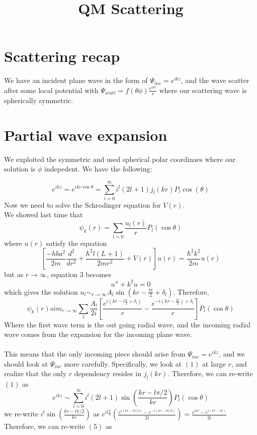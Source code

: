 \documentclass{article}
\title{QM Scattering}
\begin{document}
\maketitle
\section*{Scattering recap}
We have an incident plane wave in the form of $ \Psi_{inc}= e^{ik z}$, and the wave scatter after some local potential with $ \Psi_{scatt} = f( \theta  \phi) \frac{e^{ikr}}{r}$ where our scattering wave is spherically symmetric.

\section*{Partial wave expansion}
We exploited the symmetric and used spherical polar coordinaes where our solution is $ \phi$ indepedent. We have the following:

\begin{equation}
e^{ikz} = e^{ikr  \cos  \theta} = \sum_{i=0}^{ \infty} i^l (2l+1) j_l (kr) P_l  \cos  (\theta)
\end{equation}
Now we need to solve the Schrodinger equation for $V(r)$. \\ 
We showed last time that 
\begin{equation}
 \psi_k(r) = \sum_{l=0} \frac{u_l (r)}{r}  P_l ( \cos  \theta)
\end{equation} 
where $u(r)$ satisfy the equation 
\begin{equation}
  \left[ \frac{- hba^2}{2m}  \frac{d^2}{d r^2} + \frac{ \hbar^2 l (L+1)}{2 m r^2} + V(r) \right]u(r) = \frac{ \hbar^2 k^2}{2m}  u(r)
\end{equation}
but as $r \rightarrow  \infty$, equation $3$ becomes 
\begin{equation*}
u'' + k^2 u = 0
\end{equation*}
which gives the solution $u_l \sim_{r \rightarrow  \infty} A_l  \sin(kr - \frac{l  \pi}{2} +  \delta_l )$. Therefore,
\begin{equation}
  \psi_k (r) sim_{r \rightarrow  \infty} \sum_{l} \frac{A_l}{2 i} \left[ \frac{e^{i(kr - l \frac{ \pi}{2} +  \delta_l)}}{r} -\frac{e^{-i(kr- \frac{l  \pi}{2}  ) +  \delta_l}}{r}      \right] P_l  (\cos  \theta)
\end{equation}
Where the first wave term is the out going radial wave, and the incoming radial wave comes from the expansion for the incoming plane wave.
\\  
\\
This means that the only incoming piece should arise from $ \Psi_{inc} = e^{ikz} $, and we should look at $ \Psi_{inc}$ more carefully. Specifically, we look at $(1)$ at large $r$, and realize that the only $r$ dependency resides in $j_l (kr)$. Therefore, we can re-write $(1)$ as 
\begin{equation}
e^{ikz} \sim \sum_{l=0}^{ \infty} i^l (2l+1)  \sin( \frac{kr - l  \pi / 2}{kr}) P_l( \cos  \theta)
\end{equation}we re-write $i^l  \sin(\frac{kr - l  \pi /2}{kr} )$ as $e^{i l \frac{ \pi}{2} } (\frac{e^{i(kr - l  \pi/2)} -e^{-i( kr - l  \pi /2)}}{2i} ) = \frac{e^{ ikr} - e^{i(kr - l  \pi)}}{2 i} $ Therefore, we can re-write $(5)$ as 
\end{document}
